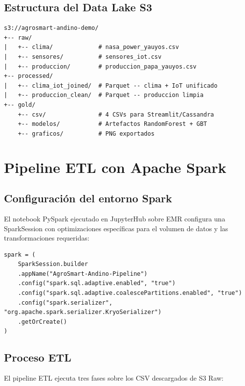 \documentclass[12pt,a4paper]{article}
\begin{document}
\subsection{Estructura del Data Lake S3}

\begin{lstlisting}[style=bashstyle, caption={Estructura de carpetas en S3}]
s3://agrosmart-andino-demo/
+-- raw/
|   +-- clima/             # nasa_power_yauyos.csv
|   +-- sensores/          # sensores_iot.csv
|   +-- produccion/        # produccion_papa_yauyos.csv
+-- processed/
|   +-- clima_iot_joined/  # Parquet -- clima + IoT unificado
|   +-- produccion_clean/  # Parquet -- produccion limpia
+-- gold/
    +-- csv/               # 4 CSVs para Streamlit/Cassandra
    +-- modelos/           # Artefactos RandomForest + GBT
    +-- graficos/          # PNG exportados
\end{lstlisting}

\section{Pipeline ETL con Apache Spark}

\subsection{Configuración del entorno Spark}

El notebook PySpark ejecutado en JupyterHub sobre EMR configura una
SparkSession con optimizaciones específicas para el volumen de datos y
las transformaciones requeridas:

\begin{lstlisting}[style=pythonstyle, caption={Configuración SparkSession}]
spark = (
    SparkSession.builder
    .appName("AgroSmart-Andino-Pipeline")
    .config("spark.sql.adaptive.enabled", "true")
    .config("spark.sql.adaptive.coalescePartitions.enabled", "true")
    .config("spark.serializer", "org.apache.spark.serializer.KryoSerializer")
    .getOrCreate()
)
\end{lstlisting}

\subsection{Proceso ETL}

El pipeline ETL ejecuta tres fases sobre los CSV descargados de S3 Raw:
\end{document}
